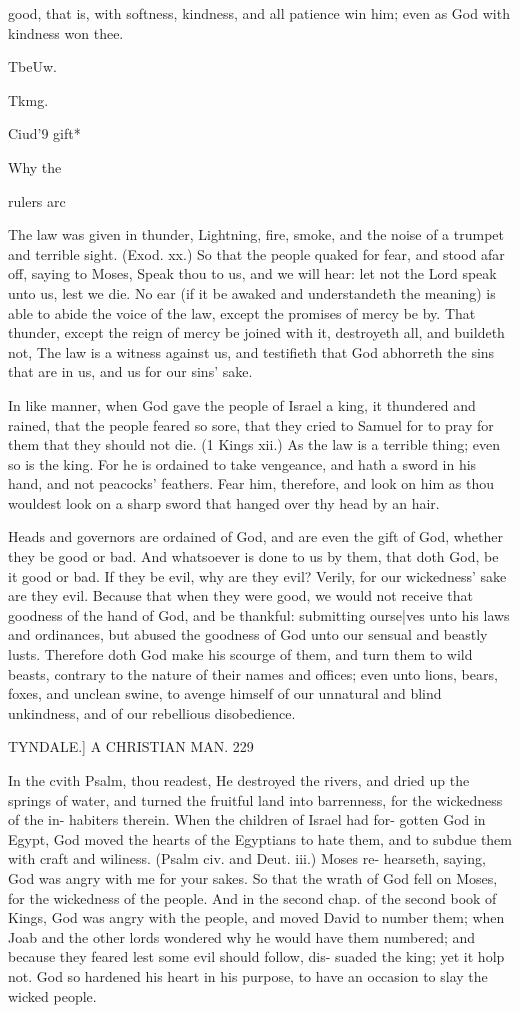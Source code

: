 \documentclass{custom}
\begin{document}
{good, that is, with softness, kindness, and all patience 
win him; even as God with kindness won thee.

TbeUw. 

T\ie kmg. 

Ciud'9 gift* 

Why the 

rulers arc 

The law was given in thunder, Lightning, fire, smoke, 
and the noise of a trumpet and terrible sight. (Exod. xx.)
So that the people quaked for fear, and stood afar off,
saying to Moses, Speak thou to us, and we will hear:
let not the Lord speak unto us, lest we die. No ear (if 
it be awaked and understandeth the meaning) is able to 
abide the voice of the law, except the promises of mercy 
be by. That thunder, except the reign of mercy be joined 
with it, destroyeth all, and buildeth not, The law is a 
witness against us, and testifieth that God abhorreth the 
sins that are in us, and us for our sins' sake.

In like manner, when God gave the people of Israel 
a king, it thundered and rained, that the people feared 
so sore, that they cried to Samuel for to pray for them 
that they should not die. (1 Kings xii.) As the law is a 
terrible thing; even so is the king. For he is ordained 
to take vengeance, and hath a sword in his hand, and not 
peacocks' feathers. Fear him, therefore, and look on
him as thou wouldest look on a sharp sword that hanged 
over thy head by an hair.

Heads and governors are ordained of God, and are 
even the gift of God, whether they be good or bad. And 
whatsoever is done to us by them, that doth God, be it 
good or bad. If they be evil, why are they evil? Verily, 
for our wickedness' sake are they evil. Because that when 
they were good, we would not receive that goodness of the 
hand of God, and be thankful: submitting ourse|ves unto 
his laws and ordinances, but abused the goodness of God 
unto our sensual and beastly lusts. Therefore doth God 
make his scourge of them, and turn them to wild beasts, 
contrary to the nature of their names and offices; even
unto lions, bears, foxes, and unclean swine, to avenge
himself of our unnatural and blind unkindness, and of 
our rebellious disobedience. 


TYNDALE.]
A CHRISTIAN MAN.
229

In the cvith Psalm, thou readest, He destroyed the 
rivers, and dried up the springs of water, and turned the 
fruitful land into barrenness, for the wickedness of the in- 
habiters therein. When the children of Israel had for- 
gotten God in Egypt, God moved the hearts of the 
Egyptians to hate them, and to subdue them with craft 
and wiliness. (Psalm civ. and Deut. iii.) Moses re- 
hearseth, saying, God was angry with me for your 
sakes. So that the wrath of God fell on Moses, for the 
wickedness of the people. And in the second chap. of 
the second book of Kings, God was angry with the people, 
and moved David to number them; when Joab and the 
other lords wondered why he would have them numbered;
and because they feared lest some evil should follow, dis- 
suaded the king; yet it holp not. God so hardened his 
heart in his purpose, to have an occasion to slay the wicked 
people. 

}
\end{document}
